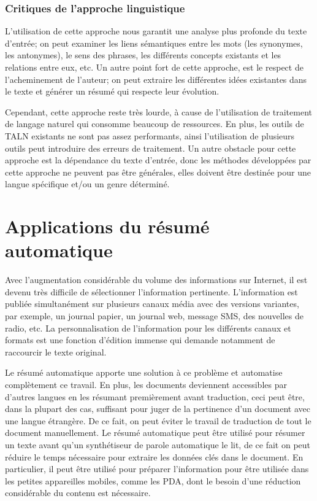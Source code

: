 \documentclass[a4paper,12pt,oneside]{../use/ESIthesis}
\begin{document}
\subsubsection{Critiques de l'approche linguistique}

L'utilisation de cette approche nous garantit une analyse plus profonde du texte d'entrée; on peut examiner les liens sémantiques entre les mots (les synonymes, les antonymes), le sens des phrases, les différents concepts existants et les relations entre eux, etc. 
Un autre point fort de cette approche, est le respect de l'acheminement de l'auteur; on peut extraire les différentes idées existantes dans le texte et générer un résumé qui respecte leur évolution.

Cependant, cette approche reste très lourde, à cause de l'utilisation de traitement de langage naturel qui consomme beaucoup de ressources. 
En plus, les outils de TALN existants ne sont pas assez performants, ainsi l'utilisation de plusieurs outils peut introduire des erreurs de traitement. 
Un autre obstacle pour cette approche est la dépendance du texte d'entrée, donc les méthodes développées par cette approche ne peuvent pas être générales, elles doivent être destinée pour une langue spécifique et/ou un genre déterminé. 

\section{Applications du résumé automatique}

Avec l'augmentation considérable du volume des informations sur Internet, il est devenu très difficile de sélectionner l'information pertinente. 
L'information est publiée simultanément sur plusieurs canaux média avec des versions variantes, par exemple, un journal papier, un journal web, message SMS, des nouvelles de radio, etc. 
La personnalisation de l'information pour les différents canaux et formats est une fonction d'édition immense qui demande notamment de raccourcir le texte original.

Le résumé automatique apporte une solution à ce problème et automatise complètement ce travail. 
En plus, les documents deviennent accessibles par d'autres langues en les résumant premièrement avant traduction, ceci peut être, dans la plupart des cas, suffisant pour juger de la pertinence d'un document avec une langue étrangère. 
De ce fait, on peut éviter le travail de traduction de tout le document manuellement. 
Le résumé automatique peut être utilisé pour résumer un texte avant qu'un synthétiseur de parole automatique le lit, de ce fait on peut réduire le temps nécessaire pour extraire les données clés dans le document. 
En particulier, il peut être utilisé pour préparer l'information pour être utilisée dans les petites appareilles mobiles, comme les PDA, dont le besoin d'une réduction considérable du contenu est nécessaire.
\end{document}
